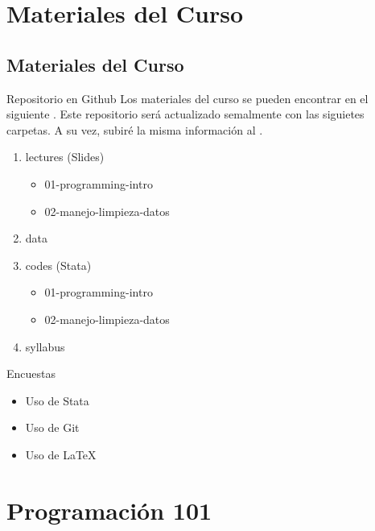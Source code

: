 \documentclass[11pt, aspectratio=169, compress]{beamer}
\begin{document}
\section{Materiales del Curso}
\subsection{Materiales del Curso}
\begin{frame}{Repositorio en Github}
	Los materiales del curso se pueden encontrar en el siguiente \href{https://github.com/lambda-stata/course-materials/tree/Jan-2022}{\color{blue}{enlace}}. Este repositorio será actualizado semalmente con las siguietes carpetas. A su vez, subiré la misma información al \href{https://aulavirtual.grupolambda.com.pe/index/curso/id/5487}{\color{blue}{Aula Virtual}}. 
	\begin{enumerate}
		\item lectures (Slides)
		\begin{itemize}
			\item 01-programming-intro
			\item 02-manejo-limpieza-datos
		\end{itemize}
		\item data
		\item codes (Stata)
		\begin{itemize}
			\item 01-programming-intro
			\item 02-manejo-limpieza-datos
		\end{itemize} 
		\item syllabus
	\end{enumerate}
\end{frame}
\begin{frame}{Encuestas}
	\begin{itemize}
		\item Uso de Stata
		\item Uso de Git
		\item Uso de \LaTeX
	\end{itemize}
\end{frame}
\section{Programación 101}
\end{document}
